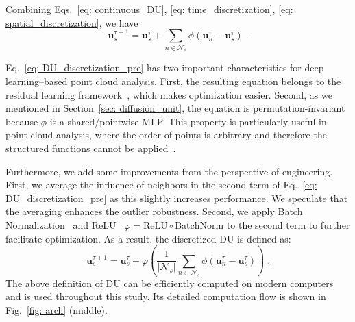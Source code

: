 \documentclass[a4paper,fleqn]{cas-dc}
\begin{document}
Combining Eqs.~\eqref{eq: continuous_DU}, \eqref{eq: time_discretization}, \eqref{eq: spatial_discretization}, we have
\begin{equation}
\textbf{u}_s^{\tau+1}
    =  \textbf{u}_s^\tau + 
    \sum_{n \in \mathcal{N}_s} \phi\left(\textbf{u}_n^\tau - \textbf{u}_s^\tau\right)\;.
    \label{eq: DU_discretization_pre}
\end{equation}


Eq.~\eqref{eq: DU_discretization_pre} has two important characteristics for deep learning--based point cloud analysis. First, the resulting equation belongs to the residual learning framework~\cite{he2016deep}, which makes optimization easier. Second, as we mentioned in Section~\ref{sec: diffusion_unit}, the equation is permutation-invariant because $\phi$ is a shared/pointwise MLP. This property is particularly useful in point cloud analysis, where the order of points is arbitrary and therefore the structured functions cannot be applied~\cite{qi2017pointnet}.               

Furthermore, we add some improvements from the perspective of engineering. First, we average the influence of neighbors in the second term of Eq.~\eqref{eq: DU_discretization_pre} as this slightly increases performance. We speculate that the averaging enhances the outlier robustness. 
Second, we apply Batch Normalization~\cite{ioffe2015batch} and ReLU~\cite{glorot2011deep} $\varphi = \mathrm{ReLU}\circ\mathrm{BatchNorm}$ to the second term to further facilitate optimization. 
As a result, the discretized DU is defined as:
\begin{equation}
    \textbf{u}_s^{\tau+1} 
    = \textbf{u}_s^\tau + 
        \varphi \left(\frac{1}{|\mathcal{N}_s|} \sum_{n \in \mathcal{N}_s} \phi\left(\textbf{u}_n^\tau - \textbf{u}_s^\tau\right)\right)\;.
    \label{eq: discretized_DU}
\end{equation}
The above definition of DU can be efficiently computed on modern computers and is used throughout this study. Its detailed computation flow is shown in Fig.~\ref{fig: arch} (middle). 
\end{document}
